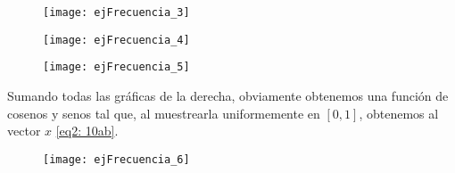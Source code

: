 \begin{ejemplo}
\begin{figure}[H]
	\centering
	\texttt{[image: ejFrecuencia\_3]} 
\end{figure}	

\begin{figure}[H]
	\centering
	\texttt{[image: ejFrecuencia\_4]} 
\end{figure}	


\begin{figure}[H]
	\centering
	\texttt{[image: ejFrecuencia\_5]} 
\end{figure}	

Sumando todas las gráficas de la derecha, obviamente
obtenemos una función de cosenos y senos tal que,
al muestrearla uniformemente en $[0,1]$, obtenemos
al vector $x$ \eqref{eq2: 10ab}.

\begin{figure}[H]
	\centering
	\texttt{[image: ejFrecuencia\_6]} 
\end{figure}	
\final
\end{ejemplo}